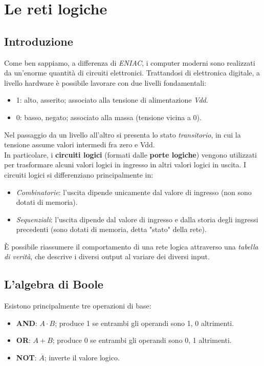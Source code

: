 \documentclass[class=book, crop=false]{standalone}
\begin{document}
\chapter{Le reti logiche}
\section{Introduzione}
Come ben sappiamo, a differenza di \emph{ENIAC}, i computer moderni sono realizzati da un'enorme quantità di circuiti elettronici. Trattandosi di elettronica digitale, a livello hardware è possibile lavorare con due livelli fondamentali:
\begin{itemize}[noitemsep, nolistsep]
	\item 1: alto, asserito; associato alla tensione di alimentazione \emph{Vdd}.
	\item 0: basso, negato; associato alla massa (tensione vicina a 0).
\end{itemize}
Nel passaggio da un livello all'altro si presenta lo stato \emph{transitorio}, in cui la tensione assume valori intermedi fra zero e Vdd.\\
In particolare, i \textbf{circuiti logici} (formati dalle \textbf{porte logiche}) vengono utilizzati per trasformare alcuni valori logici in ingresso in altri valori logici in uscita. I circuiti logici si differenziano principalmente in:
\begin{itemize}[nolistsep, noitemsep]
	\item \emph{Combinatorie}: l'uscita dipende unicamente dal valore di ingresso (non sono dotati di memoria).
	\item \emph{Sequenziali}: l'uscita dipende dal valore di ingresso e dalla storia degli ingressi precedenti (sono dotati di memoria, detta "stato" della rete).
\end{itemize}
\`{E} possibile riassumere il comportamento di una rete logica attraverso una \emph{tabella di verità}, che descrive i diversi output al variare dei diversi input.

\section{L'algebra di Boole}
Esistono principalmente tre operazioni di base:
\begin{itemize}[noitemsep, nolistsep]
	\item \textbf{AND}: \(A\cdot B\); produce 1 se entrambi gli operandi sono 1, 0 altrimenti.
	\item \textbf{OR}: \(A+B\); produce 0 se entrambi gli operandi sono 0, 1 altrimenti.
	\item \textbf{NOT}: \(\overline{A}\); inverte il valore logico.
\end{itemize}
\end{document}
